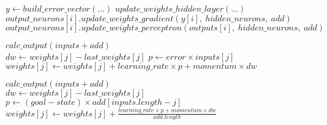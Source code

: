 \documentclass[a4paper,12pt]{article}
\begin{document}
\newpage

\begin{algorithmic}

\State $y \gets build\_error\_vector(...)$
\State $update\_weights\_hidden\_layer( ...)$
\\
\State $output\_neurons[i].update\_weights\_gradient(y[i],\ hidden\_neurons,\ add)$
\State $output\_neurons[i].update\_weights\_perceptron(outputs[i],\ hidden\_neurons,\ add)$
\EndFor
\EndFunction

\end{algorithmic}


\begin{algorithmic}

\State $calc\_output(inputs + add)$
\\
\State $dw \gets weights[j] - last\_weights[j]$
\State $p \gets error \times inputs[j]$
\State $weights[j] \gets weights[j] + learning\_rate \times p + momentum \times dw$
\EndFor
\EndFunction

\end{algorithmic}


\begin{algorithmic}

\State $calc\_output(inputs + add)$
\\
\State $dw \gets weights[j] - last\_weights[j]$
\State $p \gets (goal - state ) \times add[inputs.length - j]$
\State $weights[j] \gets weights[j] + \frac{learning\_rate \times p + momentum \times dw}{add.length} $
\EndFor
\EndFunction

\end{algorithmic}
\end{document}

